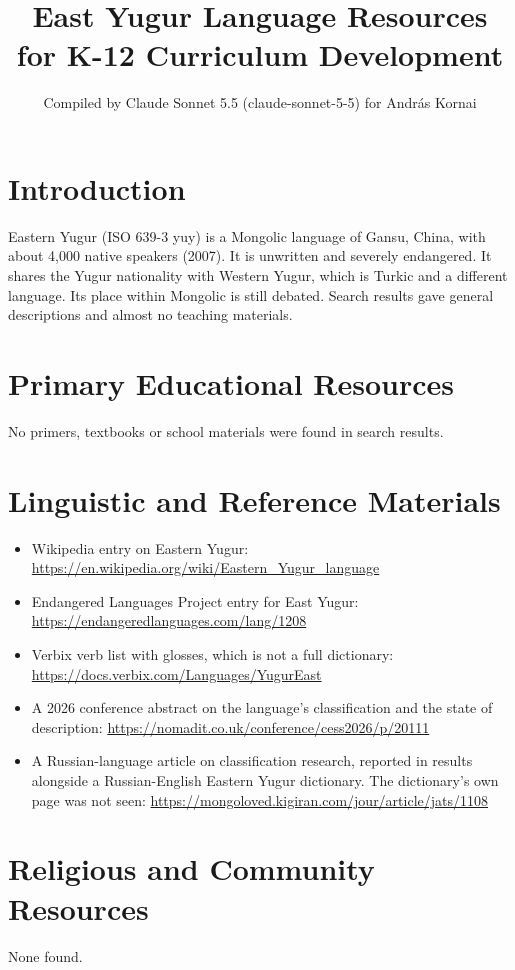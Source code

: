 \documentclass[12pt]{article}
\title{East Yugur Language Resources for K-12 Curriculum Development}
\author{Compiled by Claude Sonnet 5.5 (claude-sonnet-5-5) for Andr\'as Kornai}
\date{}
\begin{document}
\maketitle

\section{Introduction}
Eastern Yugur (ISO 639-3 yuy) is a Mongolic language of Gansu, China, with about 4,000 native speakers (2007). It is unwritten and severely endangered. It shares the Yugur nationality with Western Yugur, which is Turkic and a different language. Its place within Mongolic is still debated. Search results gave general descriptions and almost no teaching materials.

\section{Primary Educational Resources}
No primers, textbooks or school materials were found in search results.

\section{Linguistic and Reference Materials}
\begin{itemize}
\item Wikipedia entry on Eastern Yugur: \url{https://en.wikipedia.org/wiki/Eastern_Yugur_language}
\item Endangered Languages Project entry for East Yugur: \url{https://endangeredlanguages.com/lang/1208}
\item Verbix verb list with glosses, which is not a full dictionary: \url{https://docs.verbix.com/Languages/YugurEast}
\item A 2026 conference abstract on the language's classification and the state of description: \url{https://nomadit.co.uk/conference/cess2026/p/20111}
\item A Russian-language article on classification research, reported in results alongside a Russian-English Eastern Yugur dictionary. The dictionary's own page was not seen: \url{https://mongoloved.kigiran.com/jour/article/jats/1108}
\end{itemize}

\section{Religious and Community Resources}
None found.
\end{document}
